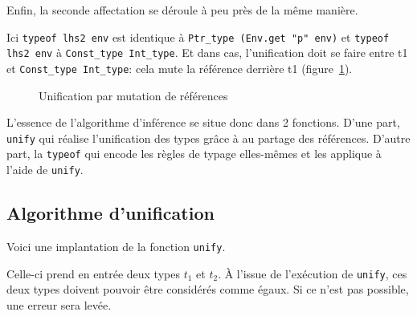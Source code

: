 Enfin, la seconde affectation se déroule à peu près de la même manière.


Ici \texttt{typeof lhs2 env} est identique à
\verb!Ptr_type (Env.get "p" env)! et \texttt{typeof lhs2 env} à \texttt{Const\_type Int\_type}. Et dans cas,
l'unification doit se faire entre t1 et \texttt{Const\_type Int\_type}: cela
mute la référence derrière t1 (figure~\ref{fig:typeunifref}).

\begin{figure}
  \caption{Unification par mutation de références}
\label{fig:typeunifref}
\end{figure}

L'essence de l'algorithme d'inférence se situe donc dans 2 fonctions. D'une
part, \texttt{unify} qui réalise l'unification des types grâce à au partage des
références. D'autre part, la \texttt{typeof} qui encode les règles de typage
elles-mêmes et les applique à l'aide de \texttt{unify}.

\subsection*{Algorithme d'unification}

Voici une implantation de la fonction \texttt{unify}.

Celle-ci prend en entrée deux types $t_1$ et $t_2$. À l'issue de l'exécution de
\texttt{unify}, ces deux types doivent pouvoir être considérés comme égaux. Si
ce n'est pas possible, une erreur sera levée.


